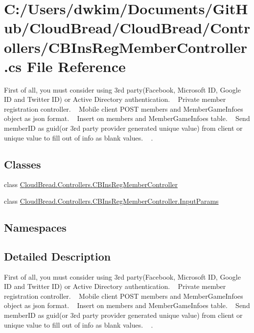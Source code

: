 \hypertarget{a00215}{}\section{C\+:/\+Users/dwkim/\+Documents/\+Git\+Hub/\+Cloud\+Bread/\+Cloud\+Bread/\+Controllers/\+C\+B\+Ins\+Reg\+Member\+Controller.cs File Reference}
\label{a00215}


First of all, you must consider using 3rd party(\+Facebook, Microsoft I\+D, Google I\+D and Twitter I\+D) or Active Directory authentication. ~\newline
Private member registration controller. ~\newline
Mobile client P\+O\+ST members and Member\+Game\+Infoes object as json format. ~\newline
Insert on members and Member\+Game\+Infoes table. ~\newline
Send member\+ID as guid(or 3rd party provider generated unique value) from client or unique value to fill out of info as blank values. ~\newline
.  


\subsection*{Classes}
\begin{DoxyCompactItemize}
\item 
class \hyperlink{a00042}{Cloud\+Bread.\+Controllers.\+C\+B\+Ins\+Reg\+Member\+Controller}
\item 
class \hyperlink{a00101}{Cloud\+Bread.\+Controllers.\+C\+B\+Ins\+Reg\+Member\+Controller.\+Input\+Params}
\end{DoxyCompactItemize}
\subsection*{Namespaces}
\begin{DoxyCompactItemize}
\end{DoxyCompactItemize}


\subsection{Detailed Description}
First of all, you must consider using 3rd party(\+Facebook, Microsoft I\+D, Google I\+D and Twitter I\+D) or Active Directory authentication. ~\newline
Private member registration controller. ~\newline
Mobile client P\+O\+ST members and Member\+Game\+Infoes object as json format. ~\newline
Insert on members and Member\+Game\+Infoes table. ~\newline
Send member\+ID as guid(or 3rd party provider generated unique value) from client or unique value to fill out of info as blank values. ~\newline
. 

